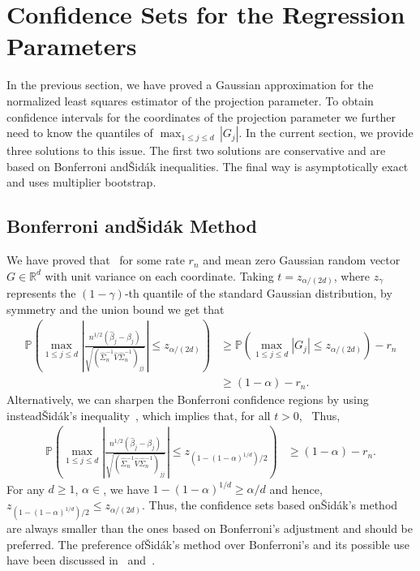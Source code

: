 \documentclass{article}
\begin{document}
\section{Confidence Sets for the Regression Parameters}\label{sec::confidence-sets-OLS}
In the previous section, we have proved a Gaussian approximation for the normalized least squares estimator of the projection parameter. To obtain confidence intervals for the coordinates of the projection parameter we further need to know the quantiles of $\max_{1\le j\le d}\,|G_j|$. In the current section, we provide three solutions to this issue. The first two solutions are conservative and are based on Bonferroni and{\v{S}}id{\'a}k inequalities. The final way is asymptotically exact and uses multiplier bootstrap.
\subsection{Bonferroni and{\v{S}}id{\'a}k Method}\label{subsec:bonferroni.sidak}
We have proved that
\ for some rate $r_n$ and mean zero Gaussian random vector $G\in\mathbb{R}^d$ with unit variance on each coordinate. Taking $t = z_{\alpha/(2d)}$, where $z_{\gamma}$ represents the $(1-\gamma)$-th quantile of the standard Gaussian distribution, by symmetry and the union bound we get that
\begin{align*}
\mathbb{P}\left(\max_{1\le j\le d}\left|\frac{n^{1/2}(\widehat{\beta}_j - \beta_j)}{\sqrt{(\widehat{\Sigma}_n^{-1}\widehat{V}\widehat{\Sigma}_n^{-1})_{jj}}}\right| \le z_{\alpha/(2d)}\right) &\ge \mathbb{P}\left(\max_{1\le j\le d}|G_j| \le z_{\alpha/(2d)}\right) - r_n\\ &\ge (1 - \alpha) - r_n.
\end{align*}
Alternatively, we can sharpen the Bonferroni confidence regions by using instead{\v{S}}id{\'a}k's inequality~\citep{vsidak1967rectangular}, which implies that, for all $t > 0$,
\ Thus,
\begin{align*}
\mathbb{P}\left(\max_{1\le j\le d}\left|\frac{n^{1/2}(\widehat{\beta}_j - \beta_j)}{\sqrt{(\widehat{\Sigma}_n^{-1}\widehat{V}\widehat{\Sigma}_n^{-1})_{jj}}}\right| \le z_{(1 - (1-\alpha)^{1/d})/2}\right) &\ge (1 - \alpha) - r_n.
\end{align*}
For any $d \ge 1$, $\alpha\in$, we have $1 - (1 - \alpha)^{1/d} \ge \alpha/d$
and hence, $z_{(1- (1-\alpha)^{1/d})/2} \le z_{\alpha/(2d)}$. Thus, the confidence sets based on{\v{S}}id{\'a}k's method are always smaller than the ones based on Bonferroni's adjustment and should be preferred.
The preference of{\v{S}}id{\'a}k's method over Bonferroni's and its possible use have been discussed in~\cite{westfall1993resampling} and~\cite{drton2004model}.
\end{document}
